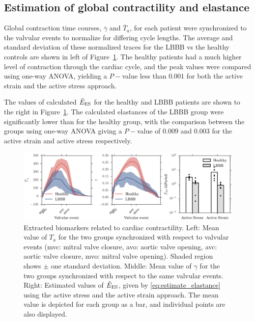 \subsection{Estimation of global contractility and elastance}

Global contraction time courses, $\overline{\gamma}$ and
  $\overline{T}_a$, for each patient were synchronized to the valvular
events to normalize for differing cycle lengths. The average 
and standard deviation of these normalized traces for the
LBBB vs the healthy controls are shown in left of
Figure~\ref{fig:contractility}. The healthy patients had a much higher
level of contraction through the cardiac cycle, and the peak values
were compared using one-way ANOVA, yielding a $P-$value less than
$0.001$ for both the active strain and the active stress approach. 

The values of calculated $\tilde{E}_{\text{ES}}$ for the healthy and LBBB patients are
shown to the right in Figure~\ref{fig:contractility}. The calculated
elastances of the LBBB group were significantly lower than for the healthy
group, with the comparison between the groups using one-way ANOVA
giving a $P-$value of $0.009$ and $0.003$ for the active strain and
active stress respectively.




\begin{figure}[htbp]
  \centering
  \includegraphics[width=\textwidth]{contractility}
  \caption{Extracted biomarkers related to cardiac contractility.
    Left:  Mean value of $T_a$ for the two groups
    synchronized with respect to valvular events (mvc: mitral valve
    closure, avo: aortic valve opening, avc: aortic valve closure,
    mvo: mitral valve opening). Shaded region shows $\pm$ one standard
    deviation.
    Middle:  Mean value of $\gamma$ for the two groups
    synchronized with respect to the same valvular events.
    Right: Estimated values of $\tilde{E}_{\text{ES}}$, given by
    \eqref{eq:estimate_elastance} using the active stress and the
    active strain approach. The mean value is depicted for each
    group as a bar, and individual points are also displayed.} 
  \label{fig:contractility}
\end{figure}



